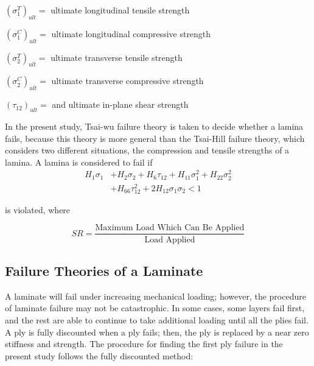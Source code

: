 \documentclass[USenglish,twocolumn]{article}
\begin{document}
$(\sigma _1^{T})_{ult}= $ ultimate longitudinal tensile strength

$(\sigma _1^{C})_{ult}= $ ultimate longitudinal compressive strength

$(\sigma _2^{T})_{ult}= $ ultimate transverse tensile strength

$(\sigma _2^{C})_{ult}= $ ultimate transverse compressive strength 

$(\tau_{12})_{ult}= $ and ultimate in-plane shear strength

In the present study, Tsai-wu failure theory is taken to decide whether a lamina fails,
because this theory is more general than the Tsai-Hill failure theory, which considers two
different situations, the compression and tensile strengths of a lamina. A lamina is considered to fail
if \begin{equation} \label{eq:tsai_wu}
\begin{split}
	H_1 \sigma_1  & + H_2 \sigma_2 + H_6 \tau_{12} + H_{11}\sigma_1^2 + H_{22} \sigma_2^2 \\
				  & + H_{66}  \tau_{12}^2 + 2H_{12}\sigma_1\sigma_2 < 1
\end{split}
\end{equation}

is violated, where

\begin{equation} \label{eq:sr}S R=\frac{\text {Maximum Load Which Can Be Applied}}{\text {Load Applied}}
\end{equation}


\subsection{Failure Theories of a Laminate}
A laminate will fail under increasing mechanical loading; however, the procedure of laminate failure may not
be catastrophic.
 In some cases, some layers fail first, and the rest are able to continue to take additional loading
 until all the plies fail. A ply is fully discounted when a ply fails; then, the ply is replaced
by a near zero stiffness and strength. 
The procedure for finding the first ply failure in the present
study follows the fully discounted method:
\end{document}
